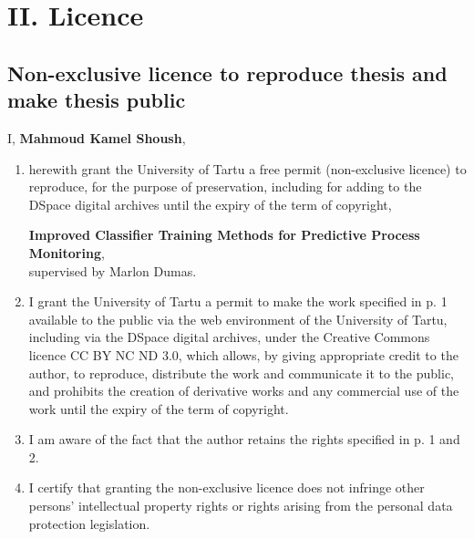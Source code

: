 \documentclass[twoside,11pt]{Latex/Classes/PhDthesisPSnPDF}
\begin{document}

%

%



\clearpage
\section*{II. Licence}


\subsection*{Non-exclusive licence to reproduce thesis and make thesis public}

I, \textbf{Mahmoud Kamel Shoush}, %

\begin{enumerate}
	\item
	herewith grant the University of Tartu a free permit (non-exclusive licence) to
	reproduce, for the purpose of preservation, including for adding to the DSpace digital archives until the expiry of the term of copyright,
	\par
	\textbf{Improved Classifier Training
		Methods for Predictive Process
		Monitoring}, %
	\\
	supervised by Marlon Dumas. %
	\item
	I grant the University of Tartu a permit to make the work specified in p. 1 available to the public via the web environment of the University of Tartu, including via the DSpace digital archives, under the Creative Commons licence CC BY NC ND 3.0, which allows, by giving appropriate credit to the author, to reproduce, distribute the work and communicate it to the public, and prohibits the creation of derivative works and any commercial use of the work until the expiry of the term of copyright.
	\item
	I am aware of the fact that the author retains the rights specified in p. 1 and 2.
	\item
	I certify that granting the non-exclusive licence does not infringe other persons' intellectual property rights or rights arising from the personal data protection legislation. 
\end{enumerate}
\end{document}
